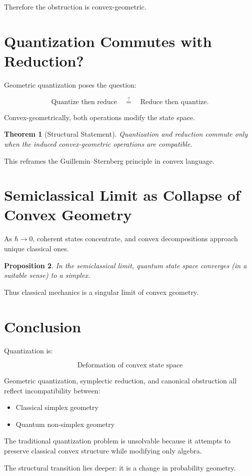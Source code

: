 \documentclass[11pt]{article}
\newtheorem{theorem}{Theorem}[section]
\newtheorem{proposition}[theorem]{Proposition}
\begin{document}
Therefore the obstruction is convex-geometric.

\section{Quantization Commutes with Reduction?}

Geometric quantization poses the question:

\[
\text{Quantize then reduce}
\quad \stackrel{?}{=}
\quad
\text{Reduce then quantize}.
\]

Convex-geometrically,
both operations modify the state space.

\begin{theorem}[Structural Statement]
Quantization and reduction commute
only when the induced convex-geometric operations
are compatible.
\end{theorem}

This reframes the Guillemin--Sternberg principle
in convex language.

\section{Semiclassical Limit as Collapse of Convex Geometry}

As $\hbar \to 0$,
coherent states concentrate,
and convex decompositions approach unique classical ones.

\begin{proposition}
In the semiclassical limit,
quantum state space converges (in a suitable sense)
to a simplex.
\end{proposition}

Thus classical mechanics is a singular limit
of convex geometry.

\section{Conclusion}

Quantization is:

\[
\text{Deformation of convex state space}
\]

Geometric quantization,
symplectic reduction,
and canonical obstruction
all reflect incompatibility between:

\begin{itemize}
\item Classical simplex geometry
\item Quantum non-simplex geometry
\end{itemize}

The traditional quantization problem
is unsolvable because it attempts to preserve
classical convex structure
while modifying only algebra.

The structural transition lies deeper:
it is a change in probability geometry.
\end{document}
